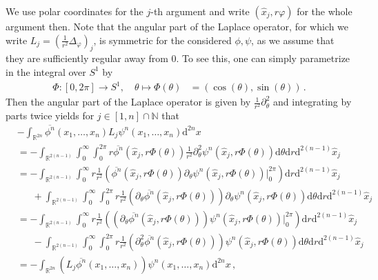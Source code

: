 We use polar coordinates for the $j$-th argument and write $(\hat{x}_{j},r\varphi)$ for the whole argument then. Note that the angular part of the Laplace operator, for which we write $L_{j} = \left( \frac{1}{r^{2}}\Delta_{\varphi} \right)_{j}$, is symmetric for the considered $\phi,\psi$, as we assume that they are sufficiently regular away from $0$. To see this, one can simply parametrize in the integral over $S^{1}$ by
\begin{align*}
  \Phi
  \colon
  [0,2\pi]
  \to
  S^{1}
  ,\quad
  \theta
  \mapsto
  \Phi(\theta)
  &=
  (\cos(\theta),\sin(\theta))
  \,.
\end{align*}
Then the angular part of the Laplace operator is given by $\frac{1}{r^{2}}\partial_{\theta}^{2}$ and integrating by parts twice yields for $j \in [1,n] \cap \mathbb{N}$ that
\begin{align*}
  &
  -
  \int_{\mathbb{R}^{2n}}
  \overline{\phi^{n}}
  \left(
    x_{1}
    ,
    \dots
    ,
    x_{n}
  \right)
  L_{j}
  \psi^{n}
  \left(
    x_{1}
    ,
    \dots
    ,
    x_{n}
  \right)
  \mathrm{d}^{2n}x
  \\
  &=
  -
  \int_{\mathbb{R}^{2(n-1)}}
  \int_{0}^{\infty}
  \int_{0}^{2\pi}
  r
  \overline{\phi^{n}}(\hat{x}_{j},r\Phi(\theta))
  \frac{1}{r^{2}}
  \partial_{\theta}^{2}
  \psi^{n}(\hat{x}_{j},r\Phi(\theta))
  \mathrm{d}\theta
  \mathrm{d}r
  \mathrm{d}^{2(n-1)}\hat{x}_{j}
  \\
  &=
  -
  \int_{\mathbb{R}^{2(n-1)}}
  \int_{0}^{\infty}
  r
  \frac{1}{r^{2}}
  \left(
    \overline{\phi^{n}}(\hat{x}_{j},r\Phi(\theta))
    \partial_{\theta}
    \psi^{n}(\hat{x}_{j},r\Phi(\theta))
    \Big\vert_{0}^{2\pi}
  \right)
  \mathrm{d}r
  \mathrm{d}^{2(n-1)}\hat{x}_{j}
  \\
  &\phantom{=\ }
  +
  \int_{\mathbb{R}^{2(n-1)}}
  \int_{0}^{\infty}
  \int_{0}^{2\pi}
  r
  \frac{1}{r^{2}}
  \left(
    \partial_{\theta}
    \overline{\phi^{n}}(\hat{x}_{j},r\Phi(\theta))
  \right)
  \partial_{\theta}
  \psi^{n}(\hat{x}_{j},r\Phi(\theta))
  \mathrm{d}\theta
  \mathrm{d}r
  \mathrm{d}^{2(n-1)}\hat{x}_{j}
  \\
  &=
  -
  \int_{\mathbb{R}^{2(n-1)}}
  \int_{0}^{\infty}
  r
  \frac{1}{r^{2}}
  \left(
    \left(
      \partial_{\theta}
      \overline{\phi^{n}}(\hat{x}_{j},r\Phi(\theta))
    \right)
    \psi^{n}(\hat{x}_{j},r\Phi(\theta))
    \Big\vert_{0}^{2\pi}
  \right)
  \mathrm{d}r
  \mathrm{d}^{2(n-1)}\hat{x}_{j}
  \\
  &\phantom{=\ }
  -
  \int_{\mathbb{R}^{2(n-1)}}
  \int_{0}^{\infty}
  \int_{0}^{2\pi}
  r
  \frac{1}{r^{2}}
  \left(
    \partial_{\theta}^{2}
    \overline{\phi^{n}}(\hat{x}_{j},r\Phi(\theta))
  \right)
  \psi^{n}(\hat{x}_{j},r\Phi(\theta))
  \mathrm{d}\theta
  \mathrm{d}r
  \mathrm{d}^{2(n-1)}\hat{x}_{j}
  \\
  &=
  -
  \int_{\mathbb{R}^{2n}}
  \left(
    L_{j}
    \overline{\phi^{n}}(x_{1},\dots,x_{n})
  \right)
  \psi^{n}(x_{1},\dots,x_{n})
  \mathrm{d}^{2n}x
  \,,
\end{align*}
